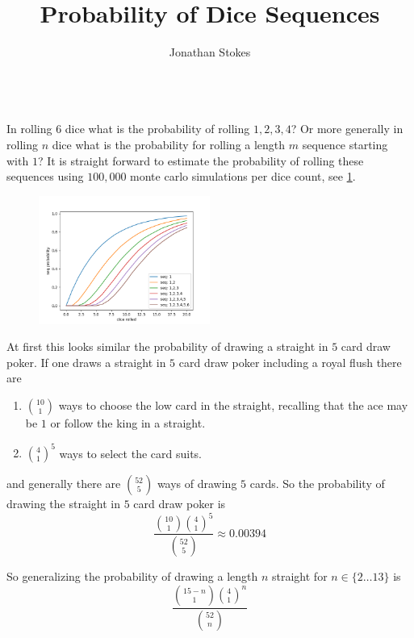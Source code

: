 \documentclass[12pt,a4paper]{article}
\title{Probability of Dice Sequences}
\author{Jonathan Stokes}
\begin{document}
\maketitle

\hrulefill\\

In rolling $6$ dice what is the probability of rolling $1,2,3,4$? Or more generally in rolling $n$ dice what is the probability for rolling a length $m$ sequence starting with $1$?
It is straight forward to estimate the probability of rolling these sequences using $100,000$ monte carlo simulations per dice count, see \cref{fig:monte_carlo_sim}.\\

\begin{figure}[h]
    \centering
    \includegraphics[width=0.5\textwidth]{figs/monte_carlo_seq_prob.png}
    \caption{}
    \label{fig:monte_carlo_sim}
\end{figure}

At first this looks similar the probability of drawing a straight in $5$ card draw poker. If one draws a straight in $5$ card draw poker including a royal flush there are 

\begin{enumerate}
\item $\binom{10}{1}$ ways to choose the low card in the straight, recalling that the ace may be $1$ or follow the king in a straight. 
\item $\binom{4}{1}^5$ ways to select the card suits.
\end{enumerate}
and generally there are $\binom{52}{5}$ ways of drawing $5$ cards. So the probability of drawing the straight in $5$ card draw poker is
\begin{equation}
\frac{\binom{10}{1}\binom{4}{1}^5}{\binom{52}{5}} \approx 0.00394
\end{equation}

So generalizing the probability of drawing a length $n$ straight for $n\in\{2 \ldots 13\}$ is 
\begin{equation}
\frac{\binom{15-n}{1}\binom{4}{1}^n}{\binom{52}{n}}
\end{equation}
\end{document}
